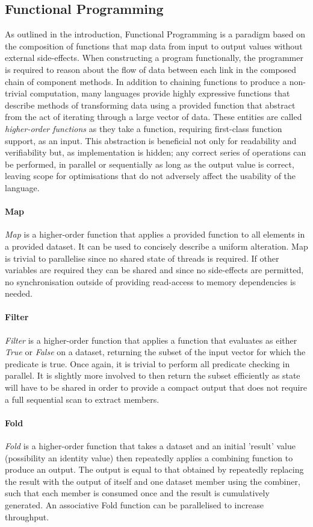 \subsection{Functional Programming}
As outlined in the introduction, Functional Programming is a paradigm based on the composition of functions that map data from input to output values without external side-effects. When constructing a program functionally, the programmer is required to reason about the flow of data between each link in the composed chain of component methods.
In addition to chaining functions to produce a non-trivial computation, many languages provide highly expressive functions\cite{ghc} that describe methods of transforming data using a provided function that abstract from the act of iterating through a large vector of data.
These entities are called \emph{higher-order functions} as they take a function, requiring first-class function support, as an input.
This abstraction is beneficial not only for readability and verifiability but, as implementation is hidden; any correct series of operations can be performed, in parallel or sequentially as long as the output value is correct, leaving scope for optimisations that do not adversely affect the usability of the language.
\paragraph{Map}
\emph{Map} is a higher-order function that applies a provided function to all elements in a provided dataset. It can be used to concisely describe a uniform alteration.
Map is trivial to parallelise since no shared state of threads is required.
If other variables are required they can be shared and since no side-effects are permitted, no synchronisation outside of providing read-access to memory dependencies is needed.
\paragraph{Filter}
\emph{Filter} is a higher-order function that applies a function that evaluates as either \emph{True} or \emph{False} on a dataset, returning the subset of the input vector for which the predicate is true. Once again, it is trivial to perform all predicate checking in parallel. It is slightly more involved to then return the subset efficiently as state will have to be shared in order to provide a compact output that does not require a full sequential scan to extract members.
\paragraph{Fold}
\emph{Fold} is a higher-order function that takes a dataset and an initial 'result' value (possibility an identity value) then repeatedly applies a combining function to produce an output. The output is equal to that obtained by repeatedly replacing the result with the output of itself and one dataset member using the combiner, such that each member is consumed once and the result is cumulatively generated. An associative Fold function can be parallelised to increase throughput.
